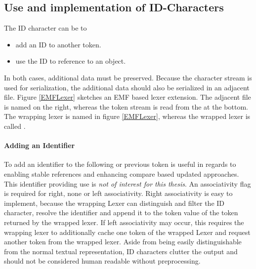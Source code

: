 \subsection{Use and implementation of ID-Characters}
 
The ID character can be to
\begin{itemize}
	\item add an ID to another token.
	\item use the ID to reference to an object.
\end{itemize}
In both cases, additional data must be preserved. Because the character stream is used for serialization, the additional data should also be serialized in an adjacent file. Figure \ref{EMFLexer} sketches an EMF based lexer extension. The adjacent file is named  on the right, whereas the token stream is read from the  at the bottom. The wrapping lexer is named  in figure \ref{EMFLexer}, whereas the wrapped lexer is called .  

\paragraph{Adding an Identifier} To add an identifier to the following or previous token is useful in regards to enabling stable references and enhancing compare based updated approaches. This identifier providing use is \emph{not of interest for this thesis}. An associativity flag is required for right, none or left associativity.  Right associativity is easy to implement, because the wrapping Lexer can distinguish and filter the ID character, resolve the identifier and append it to the token value of the token returned by the wrapped lexer. If left associativity may occur, this requires the wrapping lexer to additionally cache one token of the wrapped Lexer and request another token from the wrapped lexer. Aside from being easily distinguishable from the normal textual representation, ID characters clutter the output and should not be considered human readable without preprocessing. 
 
